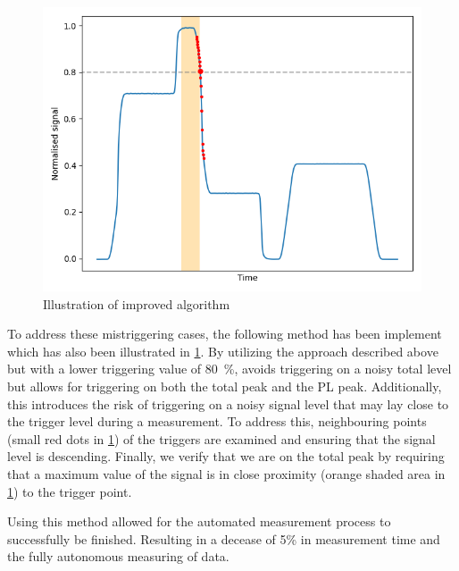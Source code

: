 \begin{figure}
    \vspace{-\baselineskip}
    \centering
    \includegraphics[width=.98\textwidth]{images/corrected_signal.png}
    \caption{Illustration of improved algorithm}
    \label{fig:corrected}
\end{figure}
To address these mistriggering cases, the following method has been implement which has also been illustrated in \cref{fig:corrected}. By utilizing the approach described above but with a lower triggering value of \qty{80}{\percent}, avoids triggering on a noisy total level but allows for triggering on both the total peak and the PL peak. Additionally, this introduces the risk of triggering on a noisy signal level that may lay close to the trigger level during a measurement. To address this, neighbouring points (small red dots in \cref{fig:corrected}) of the triggers are examined and ensuring that the signal level is descending. Finally, we verify that we are on the total peak by requiring that a maximum value of the signal is in close proximity (orange shaded area in \cref{fig:corrected}) to the trigger point.

Using this method allowed for the automated measurement process to successfully be finished.
Resulting in a decease of 5\% in measurement time and the fully autonomous measuring of data.